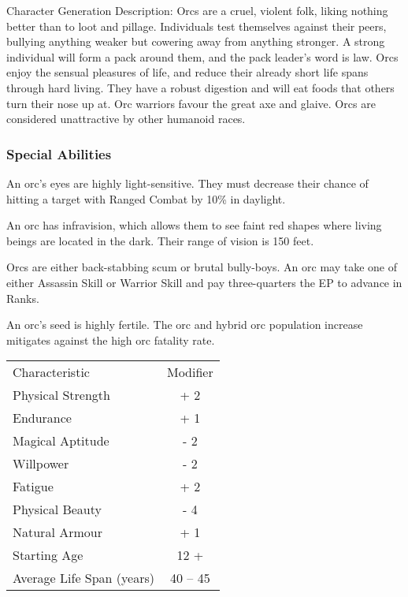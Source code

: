 \begin{Chapter}{Character Generation}
Description: Orcs are a cruel, violent folk, liking nothing better
than to loot and pillage.  Individuals test themselves against their
peers, bullying anything weaker but cowering away from anything
stronger.  A strong individual will form a pack around them, and the
pack leader’s word is law.  Orcs enjoy the sensual pleasures of life,
and reduce their already short life spans through hard living.  They
have a robust digestion and will eat foods that others turn their nose
up at.  Orc warriors favour the great axe and glaive.  Orcs are
considered unattractive by other humanoid races.

\subsubsection{Special Abilities}

\begin{Enumerate}
  
\item An orc’s eyes are highly light-sensitive.  They must decrease
  their chance of hitting a target with Ranged Combat by 10\% in
  daylight.

\item An orc has infravision, which allows them to see faint red
  shapes where living beings are located in the dark. Their range of
  vision is 150 feet.

\item Orcs are either back-stabbing scum or brutal bully-boys. An orc
  may take one of either Assassin Skill or Warrior Skill and pay
  three-quarters the EP to advance in Ranks.

\item An orc’s seed is highly fertile.  The orc and hybrid orc
  population increase mitigates against the high orc fatality rate.

\end{Enumerate}
  
\begin{tabularx}{\columnwidth}{Xc}
Characteristic 			& Modifier \\
Physical Strength		& + 2 \\
Endurance			& + 1 \\
Magical Aptitude		& - 2 \\
Willpower			& - 2 \\
Fatigue				& + 2 \\
Physical Beauty			& - 4 \\
Natural Armour			& + 1 \\
Starting Age			&  12 + \\
Average Life Span (years)	& 40 -- 45 \\
\end{tabularx}


\end{Chapter}
